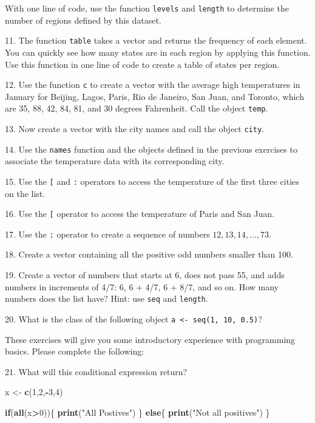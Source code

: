 \documentclass[
]{article}
\newenvironment{Shaded}{\begin{snugshade}}{\end{snugshade}}
\newcommand{\ControlFlowTok}[1]{\textcolor[rgb]{0.13,0.29,0.53}{\textbf{#1}}}
\newcommand{\DecValTok}[1]{\textcolor[rgb]{0.00,0.00,0.81}{#1}}
\newcommand{\FunctionTok}[1]{\textcolor[rgb]{0.13,0.29,0.53}{\textbf{#1}}}
\newcommand{\NormalTok}[1]{#1}
\newcommand{\OtherTok}[1]{\textcolor[rgb]{0.56,0.35,0.01}{#1}}
\newcommand{\SpecialCharTok}[1]{\textcolor[rgb]{0.81,0.36,0.00}{\textbf{#1}}}
\newcommand{\StringTok}[1]{\textcolor[rgb]{0.31,0.60,0.02}{#1}}
\begin{document}
With one line of code, use the function \texttt{levels} and
\texttt{length} to determine the number of regions defined by this
dataset.

11. The function \texttt{table} takes a vector and returns the frequency
of each element. You can quickly see how many states are in each region
by applying this function. Use this function in one line of code to
create a table of states per region.

12. Use the function \texttt{c} to create a vector with the average high
temperatures in January for Beijing, Lagos, Paris, Rio de Janeiro, San
Juan, and Toronto, which are 35, 88, 42, 84, 81, and 30 degrees
Fahrenheit. Call the object \texttt{temp}.

13. Now create a vector with the city names and call the object
\texttt{city}.

14. Use the \texttt{names} function and the objects defined in the
previous exercises to associate the temperature data with its
corresponding city.

15. Use the \texttt{{[}} and \texttt{:} operators to access the
temperature of the first three cities on the list.

16. Use the \texttt{{[}} operator to access the temperature of Paris and
San Juan.

17. Use the \texttt{:} operator to create a sequence of numbers
\(12,13,14,\dots,73\).

18. Create a vector containing all the positive odd numbers smaller than
100.

19. Create a vector of numbers that starts at 6, does not pass 55, and
adds numbers in increments of 4/7: 6, 6 + 4/7, 6 + 8/7, and so on. How
many numbers does the list have? Hint: use \texttt{seq} and
\texttt{length}.

20. What is the class of the following object
\texttt{a\ \textless{}-\ seq(1,\ 10,\ 0.5)}?

These exercises will give you some introductory experience with
programming basics. Please complete the following:

21. What will this conditional expression return?

\begin{Shaded}
\begin{Highlighting}[]
\NormalTok{x }\OtherTok{\textless{}{-}} \FunctionTok{c}\NormalTok{(}\DecValTok{1}\NormalTok{,}\DecValTok{2}\NormalTok{,}\SpecialCharTok{{-}}\DecValTok{3}\NormalTok{,}\DecValTok{4}\NormalTok{)}

\ControlFlowTok{if}\NormalTok{(}\FunctionTok{all}\NormalTok{(x}\SpecialCharTok{\textgreater{}}\DecValTok{0}\NormalTok{))\{}
  \FunctionTok{print}\NormalTok{(}\StringTok{"All Postives"}\NormalTok{)}
\NormalTok{\} }\ControlFlowTok{else}\NormalTok{\{}
  \FunctionTok{print}\NormalTok{(}\StringTok{"Not all positives"}\NormalTok{)}
\NormalTok{\}}
\end{Highlighting}
\end{Shaded}
\end{document}
